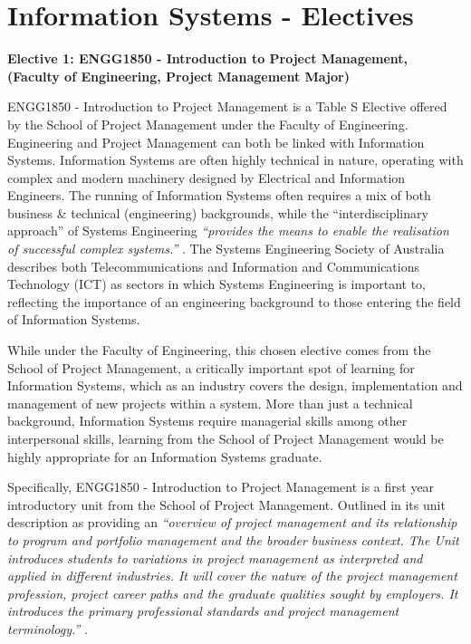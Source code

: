 \section{\textbf{Information Systems - Electives}}


\textbf{Elective 1: ENGG1850 - Introduction to Project Management, (Faculty of Engineering, Project Management Major)}


ENGG1850 - Introduction to Project Management is a Table S Elective offered by the School of Project Management under the Faculty of Engineering. Engineering and Project Management can both be linked with Information Systems. Information Systems are often highly technical in nature, operating with complex and modern machinery designed by Electrical and Information Engineers. The running of Information Systems often requires a mix of both business & technical (engineering) backgrounds, while the “interdisciplinary approach” of Systems Engineering \textit{“provides the means to enable the realisation of successful complex systems.”} \cite{SESA}. The Systems Engineering Society of Australia describes both Telecommunications and Information and Communications Technology (ICT) as sectors in which Systems Engineering is important to, reflecting the importance of an engineering background to those entering the field of Information Systems.


While under the Faculty of Engineering, this chosen elective comes from the School of Project Management, a critically important spot of learning for Information Systems, which as an industry covers the design, implementation and management of new projects within a system. More than just a technical background, Information Systems require managerial skills among other interpersonal skills, learning from the School of Project Management would be highly appropriate for an Information Systems graduate.


Specifically, ENGG1850 - Introduction to Project Management is a first year introductory unit from the School of Project Management. Outlined in its unit description as providing an \textit{“overview of project management and its relationship to program and portfolio management and the broader business context. The Unit introduces students to variations in project management as interpreted and applied in different industries. It will cover the nature of the project management profession, project career paths and the graduate qualities sought by employers. It introduces the primary professional standards and project management terminology.”} \cite{Usyd5}. 

